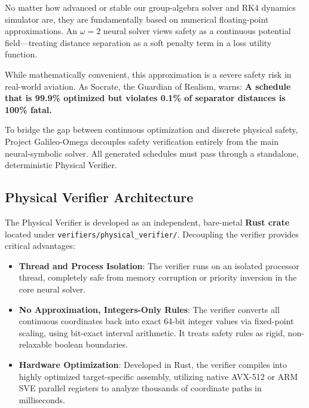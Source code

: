 \documentclass[11pt,a4paper]{book}
\begin{document}
No matter how advanced or stable our group-algebra solver and RK4 dynamics simulator are, they are fundamentally based on numerical floating-point approximations. An $\omega = 2$ neural solver views safety as a continuous potential field---treating distance separation as a soft penalty term in a loss utility function. 

While mathematically convenient, this approximation is a severe safety risk in real-world aviation. As Socrate, the Guardian of Realism, warns: \textbf{A schedule that is 99.9\% optimized but violates 0.1\% of separator distances is 100\% fatal.}

To bridge the gap between continuous optimization and discrete physical safety, Project Galileo-Omega decouples safety verification entirely from the main neural-symbolic solver. All generated schedules must pass through a standalone, deterministic Physical Verifier.

\subsection{Physical Verifier Architecture}\label{subsec:verifier_architecture}

The Physical Verifier is developed as an independent, bare-metal \textbf{Rust crate} located under \texttt{verifiers/physical\_verifier/}. Decoupling the verifier provides critical advantages:
\begin{itemize}
\item \textbf{Thread and Process Isolation}: The verifier runs on an isolated processor thread, completely safe from memory corruption or priority inversion in the core neural solver.
\item \textbf{No Approximation, Integers-Only Rules}: The verifier converts all continuous coordinates back into exact 64-bit integer values via fixed-point scaling, using bit-exact interval arithmetic. It treats safety rules as rigid, non-relaxable boolean boundaries.
\item \textbf{Hardware Optimization}: Developed in Rust, the verifier compiles into highly optimized target-specific assembly, utilizing native AVX-512 or ARM SVE parallel registers to analyze thousands of coordinate paths in milliseconds.
\end{itemize}
\end{document}
